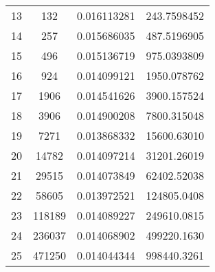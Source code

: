 \documentclass[a4paper,12pt]{article} %
\begin{document}
\begin{table}[H]
{\begin{tabular}{|c|c|c|c|}
			13                                                 & 132                  & 0.016113281              & 243.7598452                                          \\
			14                                                 & 257                  & 0.015686035              & 487.5196905                                          \\
			15                                                 & 496                  & 0.015136719              & 975.0393809                                          \\
			16                                                 & 924                  & 0.014099121              & 1950.078762                                          \\
			17                                                 & 1906                 & 0.014541626              & 3900.157524                                          \\
			18                                                 & 3906                 & 0.014900208              & 7800.315048                                          \\
			19                                                 & 7271                 & 0.013868332              & 15600.63010                                          \\
			20                                                 & 14782                & 0.014097214              & 31201.26019                                          \\
			21                                                 & 29515                & 0.014073849              & 62402.52038                                          \\
			22                                                 & 58605                & 0.013972521              & 124805.0408                                          \\
			23                                                 & 118189               & 0.014089227              & 249610.0815                                          \\
			24                                                 & 236037               & 0.014068902              & 499220.1630                                          \\
			25                                                 & 471250               & 0.014044344              & 998440.3261                                          \\

\end{tabular}}
\end{table}
\end{document}
